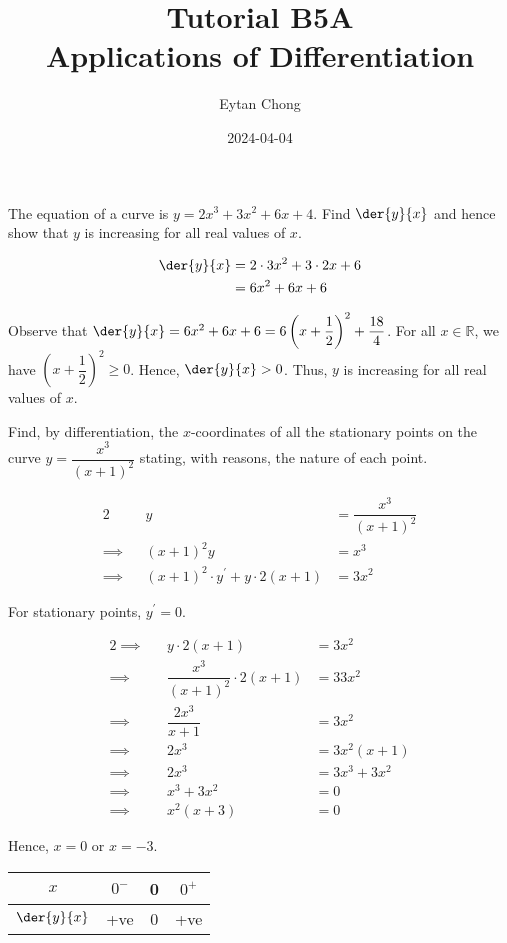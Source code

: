 \documentclass{jhwhw}
\title{Tutorial B5A\\Applications of Differentiation}
\author{Eytan Chong}
\date{2024-04-04}
\begin{document}
    \problem{}
        The equation of a curve is $y=2x^3+3x^2+6x+4$. Find $\der{y}{x}$ and hence show that $y$ is increasing for all real values of $x$.

    \solution
        \begin{align*}
            \der{y}{x} &= 2\cdot3x^2 + 3 \cdot2x + 6\\
            &= 6x^2+6x+6
        \end{align*}


        Observe that $\der{y}{x} = 6x^2 + 6x+6 = 6\left(x + \dfrac12\right)^2 + \dfrac{18}4$. For all $x \in \mathbb{R}$, we have $\left(x + \dfrac12\right)^2 \geq 0$. Hence, $\der{y}{x} > 0$. Thus, $y$ is increasing for all real values of $x$.

    \problem{}
        Find, by differentiation, the $x$-coordinates of all the stationary points on the curve $y = \dfrac{x^3}{(x+1)^2}$ stating, with reasons, the nature of each point.

    \solution
        \begin{alignat*}{2}
            &&y &= \dfrac{x^3}{(x+1)^2}\\
            \implies&&(x+1)^2y&=x^3\\
            \implies&&(x+1)^2\cdot y^\prime + y\cdot2(x+1) &= 3x^2
        \end{alignat*}

        For stationary points, $y^\prime = 0$.

        \begin{alignat*}{2}
            \implies&&y\cdot2(x+1) &= 3x^2\\
            \implies&&\dfrac{x^3}{(x+1)^2}\cdot2(x+1) &=3 3x^2\\
            \implies&&\dfrac{2x^3}{x+1} &= 3x^2\\
            \implies&&2x^3 &= 3x^2(x+1)\\
            \implies&&2x^3 &= 3x^3 + 3x^2\\
            \implies&&x^3+3x^2&=0\\
            \implies&&x^2(x+3)&=0
        \end{alignat*}

        Hence, $x = 0$ or $x = -3$.


        \begin{table}[h]
            \centering
            \begin{tabular}{|c|c|c|c|}
            \hline
            $x$          & $0^-$ & 0 & $0^+$ \\\hline
            $\der{y}{x}$ & +ve   & 0 & +ve   \\[1ex]\hline
            \end{tabular}
        \end{table}
\end{document}
